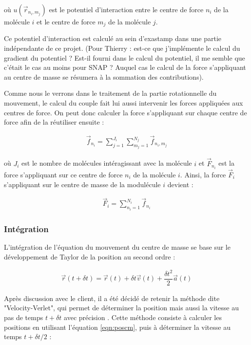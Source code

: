 \documentclass[12pt]{article}
\begin{document}
où $u\left(\vec{r}_{n_i,m_j}\right)$ est le potentiel d'interaction entre le centre de force $n_i$ de la molécule $i$ et le centre de force $m_j$ de la molécule $j$.

Ce potentiel d'interaction est calculé au sein d'exastamp dans une partie indépendante de ce projet. (Pour Thierry : est-ce que j'implémente le calcul du gradient du potentiel ? Est-il fourni dans le calcul du potentiel, il me semble que c'était le cas au moins pour SNAP ? Auquel cas le calcul de la force s'appliquant au centre de masse se résumera à la sommation des contributions).

Comme nous le verrons dans le traitement de la partie rotationnelle du mouvement, le calcul du couple fait lui aussi intervenir les forces appliquées aux centres de force. On peut donc calculer la force s'appliquant sur chaque centre de force afin de la réutiliser ensuite :

\begin{eqnarray} \label{eqn:fcm}
\vec{f}_{n_i}=\sum_{j=1}^{J_i} \sum_{m_j=1}^{N_j} \vec{f}_{n_i,m_j}
\end{eqnarray}

où $J_i$ est le nombre de molécules intéragissant avec la molécule $i$ et $\vec{F}_{n_i}$ est la force s'appliquant sur ce centre de force $n_i$ de la molécule $i$. Ainsi, la force $\vec{F}_i$ s'appliquant sur le centre de masse de la modulécule $i$ devient :

\begin{eqnarray}
\vec{F}_i=\sum_{n_i=1}^{N_i} \vec{f}_{n_i}
\end{eqnarray}

     \subsubsection{Intégration}

L'intégration de l'équation du mouvement du centre de masse se base sur le développement de Taylor de la position au second ordre :

\begin{eqnarray} \label{eqn:poscm}
\vec{r}\left(t+\delta t\right)=\vec{r}\left(t\right)+\delta t \vec{v}\left(t\right) + \dfrac{\delta t^2}{2}\vec{a}\left(t\right)
\end{eqnarray}

Après discussion avec le client, il a été décidé de retenir la méthode dite "Velocity-Verlet", qui permet de déterminer la position mais aussi la vitesse au pas de temps $t+\delta t$ avec précision \cite{allentildesley}. Cette méthode consiste à calculer les positions en utilisant l'équation \ref{eqn:poscm}, puis à déterminer la vitesse au temps $t+\delta t/2$ :
\end{document}
